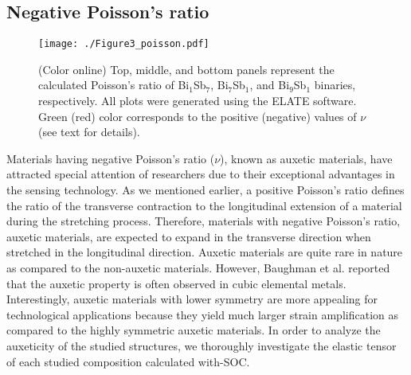 \documentclass[twocolumn,superscriptaddress,nofootinbib,floatfix,aps,showpacs,prb,citeautoscript,reprint]{revtex4-1}
\begin{document}
 \subsection{Negative Poisson's ratio}
 
\begin{figure*}[htb!]
 \centering
 \texttt{[image: ./Figure3\_poisson.pdf]}
 \caption{(Color online) Top, middle, and bottom panels represent the calculated Poisson's ratio of Bi$_{1}$Sb$_{7}$, Bi$_{7}$Sb$_{1}$, and Bi$_{9}$Sb$_{1}$ binaries, respectively. All plots were generated using the {\sc ELATE} software\cite{elate}. Green (red) color corresponds to the positive (negative) values of $\nu$ (see text for details). }
 \label{fig:poisson}
\end{figure*}


Materials having negative Poisson's ratio ($\nu$), known as auxetic materials, have attracted special attention of researchers due to their exceptional advantages in the sensing technology.\cite{KittingerPRL1981, LAKES1038, Baughman1998, Baughman2003, Greaves2011} As we mentioned earlier, a positive Poisson's ratio defines the ratio of the transverse contraction to the longitudinal extension of a material during the stretching process. Therefore, materials with negative Poisson's ratio, auxetic materials, are expected to expand in the transverse direction when stretched in the longitudinal direction. Auxetic materials are quite rare in nature as compared to the non-auxetic materials. However, Baughman et al.\cite{Baughman1998} reported that the auxetic property is often observed in cubic elemental metals. Interestingly, auxetic materials with lower symmetry are more appealing for technological applications because they yield much larger strain amplification as compared to the highly symmetric auxetic materials.\cite{Baughman2003} In order to analyze the auxeticity of the studied structures, we thoroughly investigate the elastic tensor of each studied composition calculated with-SOC. 
\end{document}
